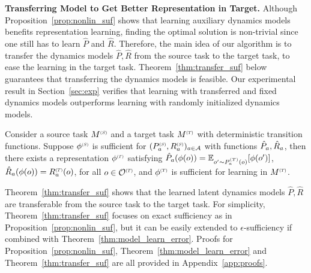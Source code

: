 \textbf{Transferring Model to Get Better Representation in Target.} 
Although Proposition~\ref{prop:nonlin_suf} shows that learning auxiliary dynamics models benefits representation learning, finding the optimal solution is non-trivial since one still has to learn $\hat{P}$ and $\hat{R}$. Therefore, the main idea of our algorithm is to transfer the dynamics models $\hat{P},\hat{R}$ from the source task to the target task, to ease the learning in the target task. Theorem~\ref{thm:transfer_suf} below guarantees that transferring the dynamics models is feasible. Our experimental result in Section~\ref{sec:exp} verifies that learning with transferred and fixed dynamics models outperforms learning with randomly initialized dynamics models.
\begin{theorem}
\label{thm:transfer_suf}
Consider a source task $\mdp\source$ and a target task $\mdp\target$ with deterministic transition functions. 
Suppose $\phi\source$ is sufficient for $(\pact\source, \ract\source)_{a\in\actions}$ with functions $\hat{P}_a, \hat{R}_a$, then there exists a representation $\phi\target$ satisfying
$\apa(\phi(o))=\mathbb{E}_{o^\prime\sim \pact\target(o)}[\phi(o^\prime)]$, $\ara(\phi(o)) = \ract\target(o)$, for all $o\in\states\target$, and $\phi\target$ is sufficient for learning in $\mdp\target$.
\end{theorem}
Theorem~\ref{thm:transfer_suf} shows that the learned latent dynamics models $\hat{P},\hat{R}$ are transferable from the source task to the target task. 
For simplicity, Theorem~\ref{thm:transfer_suf} focuses on exact sufficiency as in Proposition~\ref{prop:nonlin_suf}, but it can be easily extended to $\epsilon$-sufficiency if combined with Theorem~\ref{thm:model_learn_error}.
Proofs for Proposition~\ref{prop:nonlin_suf}, Theorem~\ref{thm:model_learn_error} and Theorem~\ref{thm:transfer_suf} are all provided in Appendix~\ref{app:proofs}.

